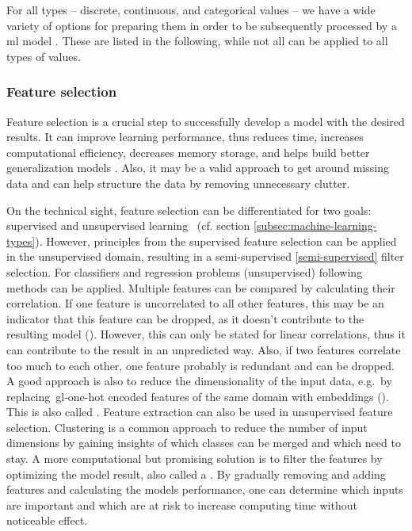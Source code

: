 For all types -- discrete, continuous, and categorical values -- we have a wide variety of options for preparing them in order to be subsequently processed by a \gls{ml} model \cite{duong2021}.
These are listed in the following, while not all can be applied to all types of values.

\subsubsection{Feature selection}

Feature selection is a crucial step to successfully develop a model with the desired results.
It can improve learning performance, thus reduces time, increases computational efficiency, decreases memory storage, and helps build better generalization models \cite{li2017feature}.
Also, it may be a valid approach to get around missing data and can help structure the data by removing unnecessary clutter.

On the technical sight, feature selection can be differentiated for two goals: supervised and unsupervised learning~\cite{li2017feature} (cf. section \ref{subsec:machine-learning-types}).
However, principles from the supervised feature selection can be applied in the unsupervised domain, resulting in a semi-supervised \ref{semi-supervised} filter selection.
For classifiers and regression problems (unsupervised) following methods can be applied.
Multiple features can be compared by calculating their correlation.
If one feature is uncorrelated to all other features, this may be an indicator that this feature can be dropped, as it doesn't contribute to the resulting model ().
However, this can only be stated for linear correlations, thus it can contribute to the result in an unpredicted way.
Also, if two features correlate too much to each other, one feature probably is redundant and can be dropped.
A good approach is also to reduce the dimensionality of the input data, e.g.\ by replacing~\gls{gl-one-hot} encoded features of the same domain with embeddings ().
This is also called .
Feature extraction can also be used in unsupervised feature selection.
Clustering is a common approach to reduce the number of input dimensions by gaining insights of which classes can be merged and which need to stay.
A more computational but promising solution is to filter the features by optimizing the model result, also called a .
By gradually removing and adding features and calculating the models performance, one can determine which inputs are important and which are at risk to increase computing time without noticeable effect.

